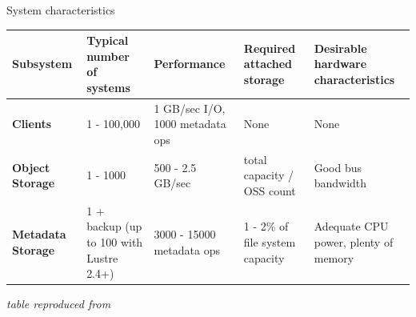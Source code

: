 
\begin{frame}{System characteristics}
    \scriptsize
    \begin{tabularx}{\textwidth}{@{}XXXXX@{}}
        \toprule
        \textbf{Subsystem}
        & Typical number of systems
        & Performance
        & Required attached storage
        & Desirable hardware characteristics\\\midrule
        \textbf{Clients}
        & 1 - 100,000
        & 1 GB/sec I/O, 1000 metadata ops
        & None
        & None \\[30pt]
        \textbf{Object Storage}
        & 1 - 1000
        & 500 - 2.5 GB/sec
        & total capacity / OSS count
        & Good bus bandwidth \\[20pt]
        \textbf{Metadata Storage}
        & 1 + backup (up to 100 with Lustre 2.4+)
        & 3000 - 15000 metadata ops
        & 1 - 2\% of file system capacity
        & Adequate CPU power, plenty of memory \\\bottomrule
    \end{tabularx}

    \vspace{0.3cm}
    \hfill{\scriptsize\emph{table reproduced from \cite{whitepaper}}}
\end{frame}
